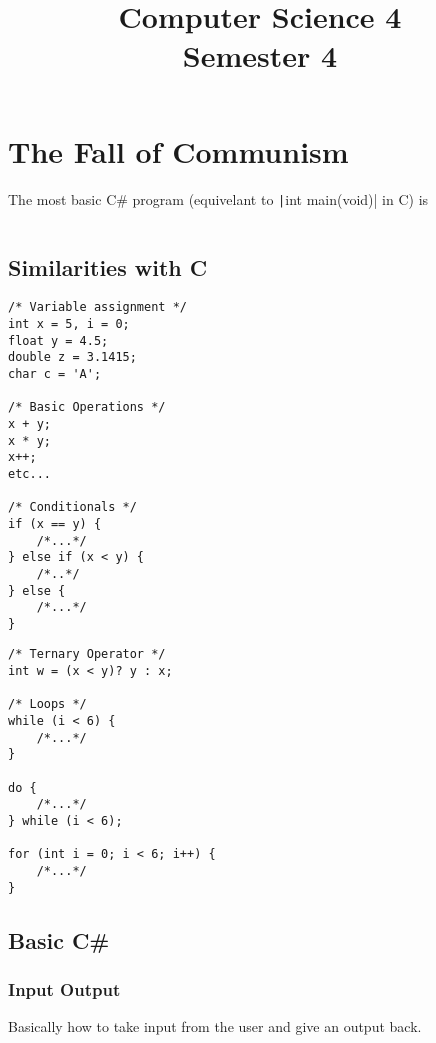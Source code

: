 \documentclass{report}
\title{\Huge{Computer Science 4}\\Semester 4}
\author{}
\date{}
\begin{document}
\maketitle
\newpage%
\tableofcontents
\pagebreak


\chapter{The Fall of Communism}
The most basic C\# program (equivelant to \texttt|int main(void)| in C) is
\inputminted{csharp}{./code/basic.cs}


\section{Similarities with C}

\begin{minipage}{0.4\linewidth}
	\begin{verbatim}
/* Variable assignment */
int x = 5, i = 0;
float y = 4.5;
double z = 3.1415;
char c = 'A';

/* Basic Operations */
x + y;
x * y;
x++;
etc...

/* Conditionals */
if (x == y) {
    /*...*/
} else if (x < y) {
    /*..*/
} else {
    /*...*/
}
    \end{verbatim}
\end{minipage}
\hfill
\begin{minipage}{0.4\linewidth}
	\begin{verbatim}
/* Ternary Operator */
int w = (x < y)? y : x;

/* Loops */
while (i < 6) {
    /*...*/
}

do {
    /*...*/
} while (i < 6);

for (int i = 0; i < 6; i++) {
    /*...*/
}

    \end{verbatim}
\end{minipage}


\section{Basic C\#}
\subsection{Input Output}

Basically how to take input from the user and give an output back.
\end{document}
